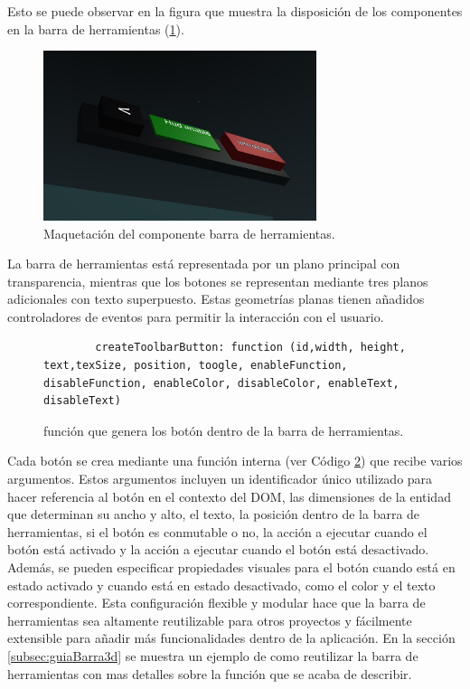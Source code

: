 \documentclass[a4paper, 11pt]{book}
\begin{document}
Esto se puede observar en la figura que muestra la disposición de los componentes en la barra de herramientas (\ref{fig:toolbarComposition}).
\begin{figure}[h]
	\centering
	\includegraphics[width=8cm, keepaspectratio]{img/toolbarElementos.jpg}
	\caption{Maquetación del componente barra de herramientas.}
	\label{fig:toolbarComposition}
\end{figure}
La barra de herramientas está representada por un plano principal con transparencia, mientras que los botones se representan mediante tres planos adicionales con texto superpuesto. Estas geometrías planas tienen añadidos controladores de eventos para permitir la interacción con el usuario.\\
\begin{figure}[h]
	\centering
	\begin{verbatim}
		createToolbarButton: function (id,width, height, text,texSize, position, toogle, enableFunction, disableFunction, enableColor, disableColor, enableText, disableText)
	\end{verbatim}
	\caption{función que genera los botón dentro de la barra de herramientas.
		\label{codigo:crearBoton}
	}
\end{figure}
Cada botón se crea mediante una función interna (ver Código \ref{codigo:crearBoton}) que recibe varios argumentos. Estos argumentos incluyen un identificador único utilizado para hacer referencia al botón en el contexto del \textsc{\gls{DOM}}, las dimensiones de la entidad que determinan su ancho y alto, el texto, la posición dentro de la barra de herramientas, si el botón es conmutable o no, la acción a ejecutar cuando el botón está activado y la acción a ejecutar cuando el botón está desactivado.
Además, se pueden especificar propiedades visuales para el botón cuando está en estado activado y cuando está en estado desactivado, como el color y el texto correspondiente. Esta configuración flexible y modular hace que la barra de herramientas sea altamente reutilizable para otros proyectos y fácilmente extensible para añadir más funcionalidades dentro de la aplicación.
En la sección \ref{subsec:guiaBarra3d} se muestra un ejemplo de como reutilizar la barra de herramientas con mas detalles sobre la función que se acaba de describir.
\end{document}
